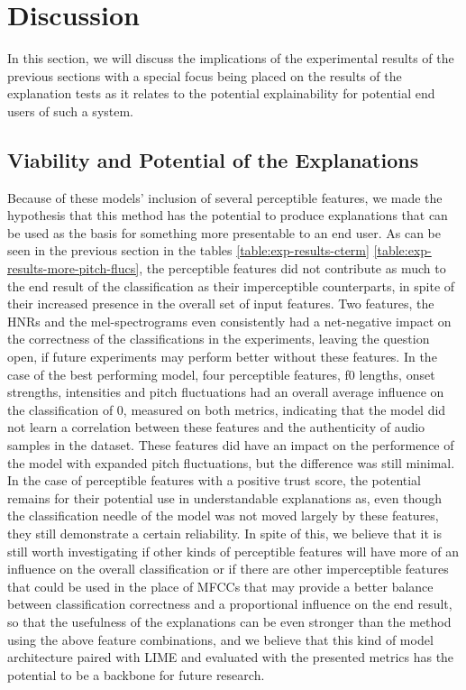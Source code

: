 \documentclass{article}
\begin{document}
	\section{Discussion}
	In this section, we will discuss the implications of the experimental results of the previous
	sections with a special focus being placed on the results of the explanation tests as it
	relates to the potential explainability for potential end users of such a system.
		\subsection{Viability and Potential of the Explanations}
		Because of these models' inclusion of several perceptible features, we made the hypothesis
		that this method has the potential to produce explanations that can be used as the basis
		for something more presentable to an end user. As can be seen in the previous section in
		the tables \ref{table:exp-results-cterm} \ref{table:exp-results-more-pitch-flucs}, the
		perceptible features did not contribute as much to the end result of the classification as
		their imperceptible counterparts, in spite of their increased presence in the overall set
		of input features. Two features, the HNRs and the mel-spectrograms even consistently had a
		net-negative impact on the correctness of the classifications in the experiments, leaving
		the question open, if future experiments may perform better without these features. In the
		case of the best performing model, four perceptible features, f0 lengths, onset strengths,
		intensities and pitch fluctuations had an overall average influence on the classification
		of 0, measured on both metrics, indicating that the model did not learn a correlation
		between these features and the authenticity of audio samples in the dataset. These features
		did have an impact on the performence of the model with expanded pitch fluctuations, but
		the difference was still minimal. In the case of perceptible features with a positive
		trust score, the potential remains for their potential use in understandable explanations
		as, even though the classification needle of the model was not moved largely by these
		features, they still demonstrate a certain reliability. In spite of this, we believe that
		it is still worth investigating if other kinds of perceptible features will have more of
		an influence on the overall classification or if there are other imperceptible features
		that could be used in the place of MFCCs that may provide a better balance between
		classification correctness and a proportional influence on the end result, so that the
		usefulness of the explanations can be even stronger than the method using the above
		feature combinations, and we believe that this kind of model architecture paired with LIME
		and evaluated with the presented metrics has the potential to be a backbone for future
		research.
\end{document}
